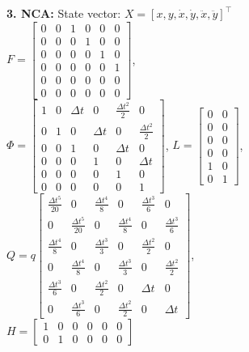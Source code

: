\documentclass[9pt]{IEEEtran}
\begin{document}
\textbf{3. NCA:}
State vector: $X = [x, y, \dot{x}, \dot{y}, \ddot{x}, \ddot{y}]^\top$ \\
$ F = \begin{bmatrix} 
  0 & 0 & 1 & 0 & 0 & 0 \\ 
  0 & 0 & 0 & 1 & 0 & 0 \\
  0 & 0 & 0 & 0 & 1 & 0 \\ 
  0 & 0 & 0 & 0 & 0 & 1 \\ 
  0 & 0 & 0 & 0 & 0 & 0 \\ 
  0 & 0 & 0 & 0 & 0 & 0 
  \end{bmatrix}$, \\
$ \Phi = \begin{bmatrix}
1 & 0 & \Delta t & 0 & \frac{\Delta t^2}{2} & 0 \\
0 & 1 & 0 & \Delta t & 0 & \frac{\Delta t^2}{2} \\
0 & 0 & 1 & 0 & \Delta t & 0 \\
0 & 0 & 0 & 1 & 0 & \Delta t \\
0 & 0 & 0 & 0 & 1 & 0 \\
0 & 0 & 0 & 0 & 0 & 1
\end{bmatrix}$, 
$ L = \begin{bmatrix}
  0 & 0 \\
  0 & 0 \\
  0 & 0 \\
  0 & 0 \\
  1 & 0 \\
  0 & 1
\end{bmatrix}$, \\
$ Q = q \begin{bmatrix}
\frac{\Delta t^5}{20} & 0 & \frac{\Delta t^4}{8} & 0 & \frac{\Delta t^3}{6} & 0 \\
0 & \frac{\Delta t^5}{20} & 0 & \frac{\Delta t^4}{8} & 0 & \frac{\Delta t^3}{6} \\
\frac{\Delta t^4}{8} & 0 & \frac{\Delta t^3}{3} & 0 & \frac{\Delta t^2}{2} & 0 \\
0 & \frac{\Delta t^4}{8} & 0 & \frac{\Delta t^3}{3} & 0 & \frac{\Delta t^2}{2} \\
\frac{\Delta t^3}{6} & 0 & \frac{\Delta t^2}{2} & 0 &  \Delta t & 0 \\
0 & \frac{\Delta t^3}{6} & 0 & \frac{\Delta t^2}{2} & 0 & \Delta t
\end{bmatrix}$, \\
$H = \begin{bmatrix}
1 & 0 & 0 & 0 & 0 & 0 \\
0 & 1 & 0 & 0 & 0 & 0
\end{bmatrix}$ \\




\end{document}

